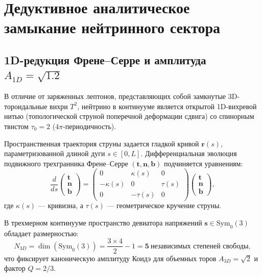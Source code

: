 \documentclass[11pt,a4paper]{article}
\theoremstyle{definition}
\theoremstyle{remark}
\begin{document}

\section{Дедуктивное аналитическое замыкание нейтринного сектора}

\subsection{1D-редукция Френе--Серре и амплитуда $A_{1D} = \sqrt{1.2}$}
В отличие от заряженных лептонов, представляющих собой замкнутые 3D-тороидальные вихри $T^2$, нейтрино в континууме является открытой 1D-вихревой нитью (топологической струной поперечной деформации сдвига) со спинорным твистом $\tau_0 = 2$ ($4\pi$-периодичность).

Пространственная траектория струны задается гладкой кривой $\mathbf{r}(s)$, параметризованной длиной дуги $s \in [0, L]$. Дифференциальная эволюция подвижного трехгранника Френе--Серре $(\mathbf{t}, \mathbf{n}, \mathbf{b})$ подчиняется уравнениям:
\begin{equation}
	\frac{d}{ds} \begin{pmatrix} \mathbf{t} \\ \mathbf{n} \\ \mathbf{b} \end{pmatrix} = \begin{pmatrix} 0 & \kappa(s) & 0 \\ -\kappa(s) & 0 & \tau(s) \\ 0 & -\tau(s) & 0 \end{pmatrix} \begin{pmatrix} \mathbf{t} \\ \mathbf{n} \\ \mathbf{b} \end{pmatrix},
\end{equation}
где $\kappa(s)$ --- кривизна, а $\tau(s)$ --- геометрическое кручение струны.

В трехмерном континууме пространство девиатора напряжений $\mathbf{s} \in \mathrm{Sym}_0(3)$ обладает размерностью:
\begin{equation}
	N_{3D} = \dim(\mathrm{Sym}_0(3)) = \frac{3 \times 4}{2} - 1 = \mathbf{5} \ \text{независимых степеней свободы},
\end{equation}
что фиксирует каноническую амплитуду Коидэ для объемных торов $A_{3D} = \sqrt{2}$ и фактор $Q = 2/3$.
\end{document}
